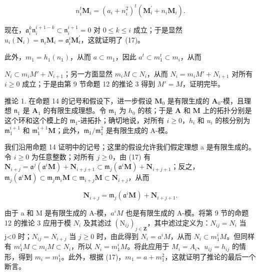 \[
n _ {i} ^ {t} \mathbf {M} _ {i} = (a _ {i} + n _ {i} ^ {2}) ^ {t} (\mathbf {M} _ {i} ^ {\prime} + n _ {i} \mathbf {M} _ {i}).
\]

	现在，\(\mathfrak{a}_i^k\mathfrak{n}_i^{i + 1 - k}\subset \mathfrak{n}_i^{i + 1} = 0\) 对 \(0\leqslant k\leqslant i\) 成立；于是显然 \(u_{i}(\mathbf{N}_{i}) = \mathfrak{n}_{i}\mathbf{M}_{i} = \mathfrak{a}_{i}^{i}\mathbf{M}_{t}^{\prime}\)，这就证明了 (17)。

	此外，\(m_1 = h_1(n_1)\)，从而 \(a \subset m_1\)，因此 \(a^t \subset m_1^t \subset m_i\)，从而

	\(N_{i} \subset m_{i}M' + N_{i+1}\)；另一方面显然 \(m_{i}M \subset N_{i}\)，从而 \(N_{i} = m_{i}M' + N_{i+1}\) 对所有 \(i \geqslant 0\) 成立；于是由第 9 节命题 12 的推论 3 得到 \(M' = M\)，证明完毕。

	推论 1. 在命题 14 的记号和假设下，进一步假设 \(\mathbf{M}_0\) 是有限生成的 \(\mathbf{A}_0\)-模，且理想 \(\mathfrak{n}_1\) 是 \(\mathbf{A}_1\) 的有限生成理想。令 \(\mathfrak{m}_1\) 为 \(h_0\) 的核；于是 \(\mathbf{A}\) 和 \(\mathbf{M}\) 上的拓扑分别是这个环和这个模上的 \(\mathfrak{m}_1\)-进拓扑；确切地说，对所有 \(i \geqslant 0\)，\(h_i\) 和 \(u_i\) 的核分别为 \(\mathfrak{m}_1^{i+1}\) 和 \(\mathfrak{m}_1^{i+1}\mathbf{M}\)；此外，\(\mathfrak{m}_1/\mathfrak{m}_1^2\) 是有限生成的 A-模。

	我们沿用命题 14 证明中的记号；这里的假设允许我们假定理想 a 是有限生成的。令 \(i \geqslant 0\) 为任意整数；对所有 \(j \geqslant 0\)，由 (17) 有 \(\mathbf{N}_{i+j} = \mathfrak{a}^j (\mathfrak{a}^i\mathbf{M}) + \mathbf{N}_{i+j+1} \subset \mathfrak{m}_j(\mathfrak{a}^i\mathbf{M}) + \mathbf{N}_{i+j+1}\)；反之，\(\mathfrak{m}_j(\mathfrak{a}^i\mathbf{M}) \subset \mathfrak{m}_j\mathfrak{m}_i\mathbf{M} \subset \mathfrak{m}_{i+j}\mathbf{M} \subset \mathbf{N}_{i+j}\)，从而

\[
\mathbf {N} _ {i + j} = \mathfrak {m} _ {j} (\mathfrak {a} ^ {i} \mathbf {M}) + \mathbf {N} _ {i + j + 1}.
\]

	由于 a 和 M 是有限生成的 A-模，\(a^{i}M\) 也是有限生成的 A-模。将第 9 节的命题 12 的推论 3 应用于模 \(N_{i}\) 及其滤过 \((\mathrm{N}_{ij})_{j\in\mathbf{Z}}\)，其中滤过定义为：\(N_{ij}=N_{i}\) 当 j\textless0 时；\(N_{ij}=N_{i+j}\) 当 \(j\geqslant0\) 时，由此得到 \(N_{i}=a^{i}M\)，从而 \(N_{i}\subset m_{1}^{i}M\)。但同样有 \(m_{1}^{i}M\subset m_{i}M\subset N_{i}\)，所以 \(N_{i}=m_{1}^{i}M\)。将此应用于 \(M_{i}=A_{i}\)、\(u_{ij}=h_{ij}\) 的情形，得到 \(m_{i}=m_{1}^{i}\)。此外，根据 (17)，\(m_{1}=a+m_{1}^{2}\)，这就证明了推论的最后一个断言。

